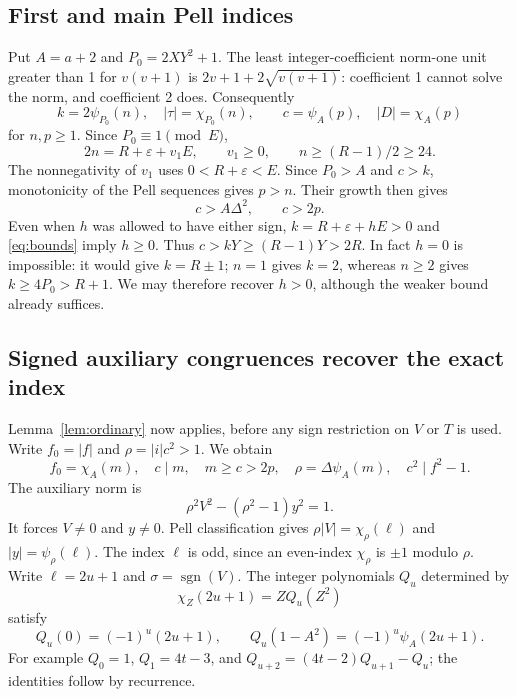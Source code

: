 \documentclass[11pt,a4paper]{article}
\theoremstyle{remark}\newtheorem{remark}[theorem]{Remark}
\newcommand{\sgn}{\operatorname{sgn}}
\begin{document}
\subsection{First and main Pell indices}
Put $A=a+2$ and $P_0=2XY^2+1$. The least integer-coefficient
norm-one unit greater than 1 for $v(v+1)$ is $2v+1+2\sqrt{v(v+1)}$:
coefficient 1 cannot solve the norm, and coefficient 2 does.
Consequently
\[
 k=2\psi_{P_0}(n),\quad |\tau|=\chi_{P_0}(n),\qquad
 c=\psi_A(p),\quad |D|=\chi_A(p)
\]
for $n,p\ge1$. Since $P_0\equiv1\pmod E$,
\begin{equation}
 2n=R+\varepsilon+v_1E,\qquad v_1\ge0,
 \qquad n\ge(R-1)/2\ge24.
 \label{eq:first-index}
\end{equation}
The nonnegativity of $v_1$ uses $0<R+\varepsilon<E$.
Since $P_0>A$ and $c>k$, monotonicity of the Pell sequences gives
$p>n$. Their growth then gives
\[
 c>A\Delta^2,\qquad c>2p.
\]
Even when $h$ was allowed to have either sign,
$k=R+\varepsilon+hE>0$ and \eqref{eq:bounds} imply $h\ge0$.
Thus $c>kY\ge(R-1)Y>2R$.
In fact $h=0$ is impossible: it would give $k=R\pm1$;
$n=1$ gives $k=2$, whereas $n\ge2$ gives
$k\ge4P_0>R+1$. We may therefore recover $h>0$, although
the weaker bound already suffices.

\subsection{Signed auxiliary congruences recover the exact index}
Lemma~\ref{lem:ordinary} now applies, before any sign restriction on
$V$ or $T$ is used. Write $f_0=|f|$ and
$\rho=|i|c^2>1$. We obtain
\[
 f_0=\chi_A(m),\quad c\mid m,\quad m\ge c>2p,
 \quad\rho=\Delta\psi_A(m),\quad c^2\mid f^2-1.
\]
The auxiliary norm is
\[
 \rho^2V^2-(\rho^2-1)y^2=1.
\]
It forces $V\ne0$ and $y\ne0$. Pell classification gives
$\rho|V|=\chi_\rho(\ell)$ and $|y|=\psi_\rho(\ell)$.
The index $\ell$ is odd, since an even-index $\chi_\rho$ is
$\pm1$ modulo $\rho$. Write $\ell=2u+1$ and
$\sigma=\sgn(V)$. The integer polynomials $Q_u$ determined by
\[
 \chi_Z(2u+1)=ZQ_u(Z^2)
\]
satisfy
\[
 Q_u(0)=(-1)^u(2u+1),\qquad
 Q_u(1-A^2)=(-1)^u\psi_A(2u+1).
\]
For example $Q_0=1$, $Q_1=4t-3$, and
$Q_{u+2}=(4t-2)Q_{u+1}-Q_u$; the identities follow by recurrence.
\end{document}
